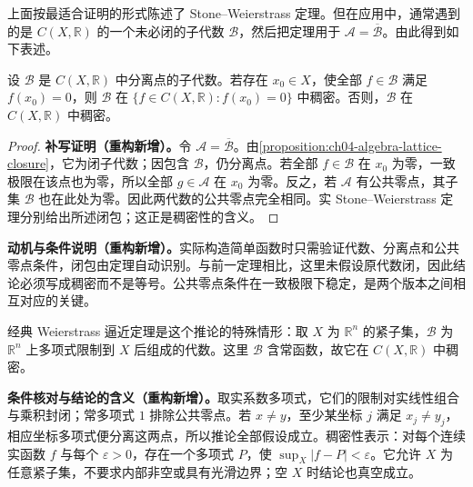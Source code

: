 \documentclass[../../main.tex]{subfiles}%
\begin{document}
上面按最适合证明的形式陈述了 Stone--Weierstrass 定理。但在应用中，通常遇到的是 $C(X,\mathbb R)$ 的一个未必闭的子代数 $\mathcal B$，然后把定理用于 $\mathcal A=\overline{\mathcal B}$。由此得到如下表述。
\begin{corollary}\label{corollary:ch04-sw-density}
设 $\mathcal B$ 是 $C(X,\mathbb R)$ 中分离点的子代数。若存在 $x_0\in X$，使全部 $f\in\mathcal B$ 满足 $f(x_0)=0$，则 $\mathcal B$ 在 $\{f\in C(X,\mathbb R):f(x_0)=0\}$ 中稠密。否则，$\mathcal B$ 在 $C(X,\mathbb R)$ 中稠密。
\end{corollary}
\begin{proof}
\textbf{补写证明（重构新增）。}令 $\mathcal A=\overline{\mathcal B}$。由\cref{proposition:ch04-algebra-lattice-closure}，它为闭子代数；因包含 $\mathcal B$，仍分离点。若全部 $f\in\mathcal B$ 在 $x_0$ 为零，一致极限在该点也为零，所以全部 $g\in\mathcal A$ 在 $x_0$ 为零。反之，若 $\mathcal A$ 有公共零点，其子集 $\mathcal B$ 也在此处为零。因此两代数的公共零点完全相同。实 Stone--Weierstrass 定理分别给出所述闭包；这正是稠密性的含义。
\end{proof}
\begin{remark}
\textbf{动机与条件说明（重构新增）。}实际构造简单函数时只需验证代数、分离点和公共零点条件，闭包由定理自动识别。与前一定理相比，这里未假设原代数闭，因此结论必须写成稠密而不是等号。公共零点条件在一致极限下稳定，是两个版本之间相互对应的关键。
\end{remark}
经典 Weierstrass 逼近定理是这个推论的特殊情形：取 $X$ 为 $\mathbb R^n$ 的紧子集，$\mathcal B$ 为 $\mathbb R^n$ 上多项式限制到 $X$ 后组成的代数。这里 $\mathcal B$ 含常函数，故它在 $C(X,\mathbb R)$ 中稠密。
\begin{remark}
\textbf{条件核对与结论的含义（重构新增）。}取实系数多项式，它们的限制对实线性组合与乘积封闭；常多项式 $1$ 排除公共零点。若 $x\ne y$，至少某坐标 $j$ 满足 $x_j\ne y_j$，相应坐标多项式便分离这两点，所以推论全部假设成立。稠密性表示：对每个连续实函数 $f$ 与每个 $\varepsilon>0$，存在一个多项式 $P$，使 $\sup_X|f-P|<\varepsilon$。它允许 $X$ 为任意紧子集，不要求内部非空或具有光滑边界；空 $X$ 时结论也真空成立。
\end{remark}
\end{document}
